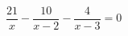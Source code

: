 \begin{ex}[type=equation]
	\begin{condition}
		\( \dfrac{21}{x}-\dfrac{10}{x-2}-\dfrac{4}{x-3}=0 \)
	\end{condition}
\end{ex}